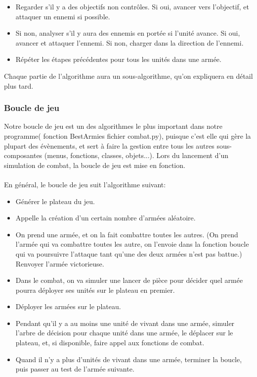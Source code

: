 \documentclass[a4paper, 11pt]{article}
\begin{document}
\begin{itemize}

\item Regarder s'il y a des objectifs non contrôles. Si oui, avancer vers l'objectif, et attaquer un ennemi si possible.
\item Si non, analyser s'il y aura des ennemis en portée si l'unité avance. Si oui, avancer et attaquer l'ennemi. Si non, charger dans la direction de l'ennemi.
\item Répéter les étapes précédentes pour tous les unités dans une armée.

\end{itemize}

Chaque partie de l'algorithme aura un sous-algorithme, qu'on expliquera en détail plus tard.

\subsubsection{Boucle de jeu}

Notre boucle de jeu est un des algorithmes le plus important dans notre programme( fonction BestArmies fichier combat.py), puisque c'est elle qui gère la plupart des évènements, et sert à faire la gestion entre tous les autres sous-composantes (menus, fonctions, classes, objets...).
Lors du lancement d'un simulation de combat, la boucle de jeu est mise en fonction. \\ \\

En général, le boucle de jeu suit l'algorithme suivant: \\


\begin{itemize}

\item Générer le plateau du jeu.
\item Appelle la création d'un certain nombre d'armées aléatoire.
\item On prend une armée, et on la fait combattre toutes les autres. (On prend l'armée qui va combattre toutes les autre, on l’envoie dans la fonction boucle qui va poursuivre l'attaque tant qu'une des deux armées n'est pas battue.) Renvoyer l'armée victorieuse.   
\item Dans le combat, on va simuler une lancer de pièce pour décider quel armée pourra déployer ses unités sur le plateau en premier.
\item Déployer les armées sur le plateau.
\item Pendant qu'il y a au moins une unité de vivant dans une armée, simuler l'arbre de décision pour chaque unité dans une armée, le déplacer sur le plateau, et, si disponible, faire appel aux fonctions de combat.
\item Quand il n'y a plus d'unités de vivant dans une armée, terminer la boucle, puis passer au test de l'armée suivante.

\end{itemize}
\end{document}
